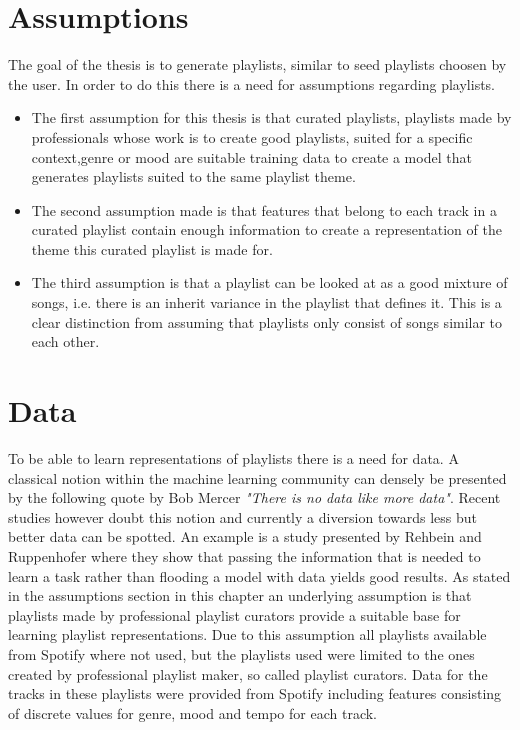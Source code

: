 \documentclass[a4paper,11pt]{kth-mag}
\begin{document}
\section{Assumptions}
The goal of the thesis is to generate playlists, similar to seed playlists choosen by the user. In order to do this there is a need for assumptions regarding playlists.

\begin{itemize}


\item The first assumption for this thesis is that curated playlists, playlists made by professionals whose work is to create good playlists, suited for a specific context,genre or mood are suitable training data to create a model that generates playlists suited to the same playlist theme.

\item The second assumption made is that features that belong to each track in a curated playlist contain enough information to create a representation of the theme this curated playlist is made for.

\item The third assumption is that a playlist can be looked at as a good mixture of songs, i.e. there is an inherit variance in the playlist that defines it. This is a clear distinction from assuming that playlists only consist of songs similar to each other.

\end{itemize}
 

\section{Data}
To be able to learn representations of playlists there is a need for data. A classical notion within the machine learning community can densely be presented by the following quote by Bob Mercer \textit{"There is no data like more data"}. Recent studies however doubt this notion and currently a diversion towards less but better data can be spotted. An example is a study presented by Rehbein and Ruppenhofer where they show that passing the information that is needed to learn a task rather than flooding a model with data yields good results\cite{rehbein2010there}. As stated in the assumptions section in this chapter an underlying assumption is that playlists made by professional playlist curators provide a suitable base for learning playlist representations. Due to this assumption all playlists available from Spotify where not used, but the playlists used were limited to the ones created by professional playlist maker, so called playlist curators. Data for the tracks in these playlists were provided from Spotify including features consisting of discrete values for genre, mood and tempo for each track.
\end{document}
